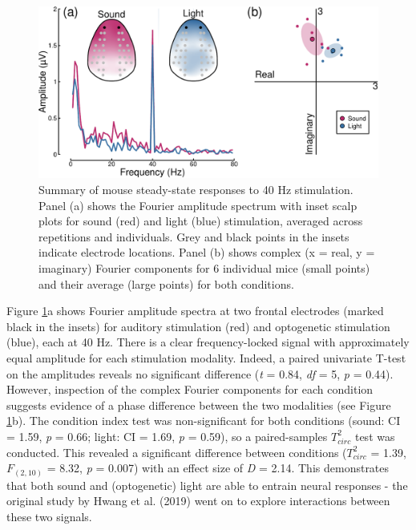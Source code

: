 \documentclass[]{article}
\begin{document}
\begin{figure}

{\centering \includegraphics{manuscript_files/figure-latex/mousedata-1} 

}

\caption{Summary of mouse steady-state responses to 40 Hz stimulation. Panel (a) shows the Fourier amplitude spectrum with inset scalp plots for sound (red) and light (blue) stimulation, averaged across repetitions and individuals. Grey and black points in the insets indicate electrode locations. Panel (b) shows complex (x = real, y = imaginary) Fourier components for 6 individual mice (small points) and their average (large points) for both conditions.}\label{fig:mousedata}
\end{figure}

Figure \ref{fig:mousedata}a shows Fourier amplitude spectra at two frontal electrodes (marked black in the insets) for auditory stimulation (red) and optogenetic stimulation (blue), each at 40 Hz. There is a clear frequency-locked signal with approximately equal amplitude for each stimulation modality. Indeed, a paired univariate T-test on the amplitudes reveals no significant difference (\emph{t} = 0.84, \emph{df} = 5, \emph{p} = 0.44). However, inspection of the complex Fourier components for each condition suggests evidence of a phase difference between the two modalities (see Figure \ref{fig:mousedata}b). The condition index test was non-significant for both conditions (sound: CI = 1.59, \emph{p} = 0.66; light: CI = 1.69, \emph{p} = 0.59), so a paired-samples \(T^2_{circ}\) test was conducted. This revealed a significant difference between conditions (\(T^2_{circ}\) = 1.39, \(F_{(2,10)}\) = 8.32, \emph{p} = 0.007) with an effect size of \emph{D} = 2.14. This demonstrates that both sound and (optogenetic) light are able to entrain neural responses - the original study by Hwang et al. (2019) went on to explore interactions between these two signals.
\end{document}
